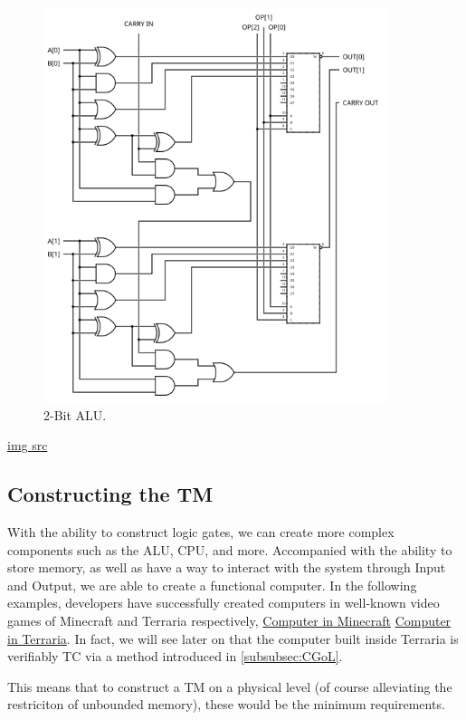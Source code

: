 \begin{figure}[htb]
    \centering
    \includegraphics[width=10cm]{Images/2-bit_ALU.svg.png}
       \caption{2-Bit ALU.}
           \label{Fig:2BitALU}
\end{figure}

\href{https://en.wikibooks.org/wiki/File:2-bit_ALU.svg}{img src}

\subsection{Constructing the TM}\label{subsec:CreateTM}

With the ability to construct logic gates, we can create more complex components such as the ALU, CPU, and more.
Accompanied with the ability to store memory, as well as have a way to interact with the system through Input and Output, we are able to create a functional computer.
In the following examples, developers have successfully created computers in well-known video games of Minecraft and Terraria respectively,
\href{https://www.youtube.com/watch?v=CW9N6kGbu2I}{Computer in Minecraft}
\href{https://www.youtube.com/watch?v=zXPiqk0-zDY}{Computer in Terraria}.
In fact, we will see later on that the computer built inside Terraria is verifiably TC via a method introduced in \ref{subsubsec:CGoL}.

This means that to construct a TM on a physical level (of course alleviating the restriciton of unbounded memory), these would be the minimum requirements.

